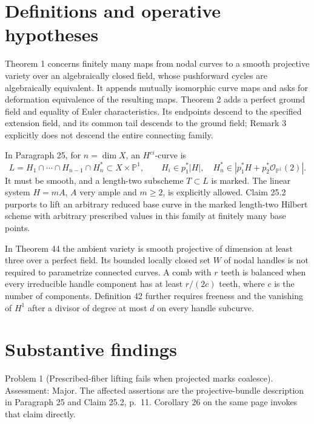 \documentclass[10pt]{article}
\begin{document}
\section*{Definitions and operative hypotheses}
Theorem 1 concerns finitely many maps from nodal curves to a smooth projective variety over an algebraically closed field, whose pushforward cycles are algebraically equivalent. It appends mutually isomorphic curve maps and asks for deformation equivalence of the resulting maps. Theorem 2 adds a perfect ground field and equality of Euler characteristics. Its endpoints descend to the specified extension field, and its common tail descends to the ground field; Remark 3 explicitly does not descend the entire connecting family.\par
In Paragraph 25, for \(n=\dim X\), an \(H^{ci}\)-curve is \[L=H_1\cap\cdots\cap H_{n-1}\cap H_n^*
 \subset X\times\mathbb P^1,\qquad
 H_i\in p_1^*|H|,\quad H_n^*\in|p_1^*H+p_2^*\mathcal O_{\mathbb P^1}(2)|.\] It must be smooth, and a length-two subscheme \(T\subset L\) is marked. The linear system \(H=mA\), \(A\) very ample and \(m\geq2\), is explicitly allowed. Claim 25.2 purports to lift an arbitrary reduced base curve in the marked length-two Hilbert scheme with arbitrary prescribed values in this family at finitely many base points.\par
In Theorem 44 the ambient variety is smooth projective of dimension at least three over a perfect field. Its bounded locally closed set \(W\) of nodal handles is not required to parametrize connected curves. A comb with \(r\) teeth is balanced when every irreducible handle component has at least \(r/(2c)\) teeth, where \(c\) is the number of components. Definition 42 further requires freeness and the vanishing of \(H^1\) after a divisor of degree at most \(d\) on every handle subcurve.\par
\section*{Substantive findings}
Problem 1 (Prescribed-fiber lifting fails when projected marks coalesce).  Assessment: Major. The affected assertions are the projective-bundle description in Paragraph 25 and Claim 25.2, p. 11. Corollary 26 on the same page invokes that claim directly.\par
\end{document}
